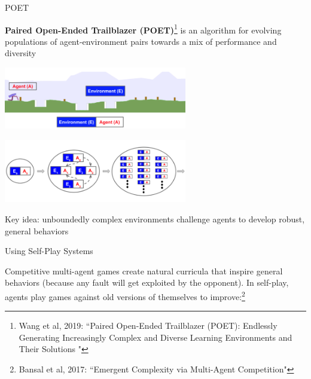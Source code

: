 \documentclass[9pt]{beamer}
\begin{document}
\begin{frame}{POET}

\textbf{Paired Open-Ended Trailblazer (POET)}\footnote{Wang et al, 2019: ``Paired Open-Ended Trailblazer (POET): Endlessly Generating Increasingly Complex and Diverse Learning Environments and Their Solutions
"} is an algorithm for evolving populations of agent-environment pairs towards a mix of performance and diversity

\begin{center}
\includegraphics[width=0.6\textwidth]{p2-poet1}

\includegraphics[width=0.6\textwidth]{p2-poet2}
\end{center}

Key idea: unboundedly complex environments challenge agents to develop robust, general behaviors
\end{frame}

\begin{frame}{Using Self-Play Systems}

Competitive multi-agent games create natural curricula that inspire general behaviors (because any fault will get exploited by the opponent). In self-play, agents play games against old versions of themselves to improve:\footnote{Bansal et al, 2017: ``Emergent Complexity via Multi-Agent Competition"}

\begin{center}
\end{center}


\end{frame}
\end{document}
